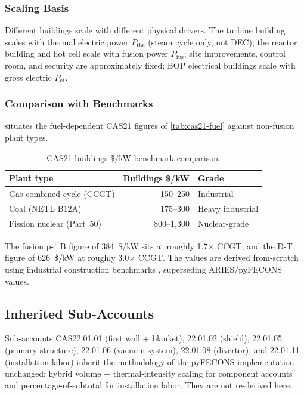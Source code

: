 \documentclass{article}
\begin{document}
\subsubsection{Scaling Basis}
Different buildings scale with different physical drivers.  The
turbine building scales with thermal electric power $P_{\text{the}}$
(steam cycle only, not DEC); the reactor building and hot cell scale
with fusion power $P_{\text{fus}}$; site improvements, control room,
and security are approximately fixed; BOP electrical buildings scale
with gross electric $P_{\text{et}}$.

\subsubsection{Comparison with Benchmarks}
 situates the fuel-dependent CAS21 figures
of \cref{tab:cas21-fuel} against non-fusion plant types.

\begin{table}[htbp]
\caption{CAS21 buildings \$/kW benchmark comparison.}
\label{tab:cas21-benchmarks}
\centering
\begin{tabular}{lrl}
\toprule
Plant type & Buildings \$/kW & Grade \\
\midrule
Gas combined-cycle (CCGT) & 150--250 & Industrial \\
Coal (NETL B12A) & 175--300 & Heavy industrial \\
Fission nuclear (Part~50) & 800--1{,}300 & Nuclear-grade \\
\bottomrule
\end{tabular}
\end{table}

The fusion p-${}^{11}$B figure of 384~\$/kW sits at roughly
1.7$\times$ CCGT, and the D-T figure of 626~\$/kW at roughly
3.0$\times$ CCGT.
The values are derived from-scratch using industrial construction
benchmarks \citep{cushman_wakefield_2025, netl2022, nrel_atb2024,
breakthrough2022}, superseding ARIES/pyFECONS values.


\subsection{Inherited Sub-Accounts}
\label{sec:cas22-inherited}

Sub-accounts CAS22.01.01 (first wall + blanket), 22.01.02 (shield),
22.01.05 (primary structure), 22.01.06 (vacuum system), 22.01.08
(divertor), and 22.01.11 (installation labor) inherit the methodology
of the pyFECONS implementation \citep{woodruff2026} unchanged: hybrid
volume + thermal-intensity scaling for component accounts and
percentage-of-subtotal for installation labor. They are not
re-derived here.
\end{document}

